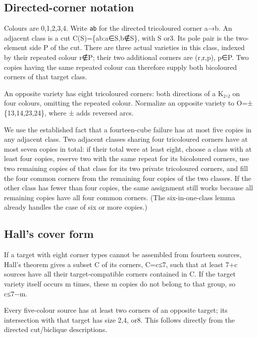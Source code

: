 \documentclass[
  10pt,
]{article}
\begin{document}
\hypertarget{directed-corner-notation}{%
\subsection*{Directed-corner notation}\label{directed-corner-notation}}

Colours are 0,1,2,3,4. Write \texttt{ab} for the directed tricoloured
corner a→b. An adjacent class is a cut C(S)=\{ab:a∈S,b∉S\}, with
\textbar S or3. Its pole pair is the two-element side P of the
cut. There are three actual varieties in this class, indexed by their
repeated colour r∉P; their two additional corners are (r,r,p), p∈P. Two
copies having the same repeated colour can therefore supply both
bicoloured corners of that target class.

An opposite variety has eight tricoloured corners: both directions of a
K₂,₂ on four colours, omitting the repeated colour. Normalize an
opposite variety to O=±\{13,14,23,24\}, where ± adds reversed arcs.

We use the established fact that a fourteen-cube failure has at most
five copies in any adjacent class. Two adjacent classes sharing four
tricoloured corners have at most seven copies in total: if their total
were at least eight, choose a class with at least four copies, reserve
two with the same repeat for its bicoloured corners, use two remaining
copies of that class for its two private tricoloured corners, and fill
the four common corners from the remaining four copies of the two
classes. If the other class has fewer than four copies, the same
assignment still works because all remaining copies have all four common
corners. (The six-in-one-class lemma already handles the case of six or
more copies.)

\hypertarget{halls-cover-form}{%
\subsection*{Hall's cover form}\label{halls-cover-form}}

If a target with eight corner types cannot be assembled from fourteen
sources, Hall's theorem gives a subset C of its corners,
\textbar C\textbar=c≤7, such that at least 7+c sources have all their
target-compatible corners contained in C. If the target variety itself
occurs m times, these m copies do not belong to that group, so c≤7−m.

Every five-colour source has at least two corners of an opposite target;
its intersection with that target has size 2,4, or8. This follows
directly from the directed cut/biclique descriptions.
\end{document}

